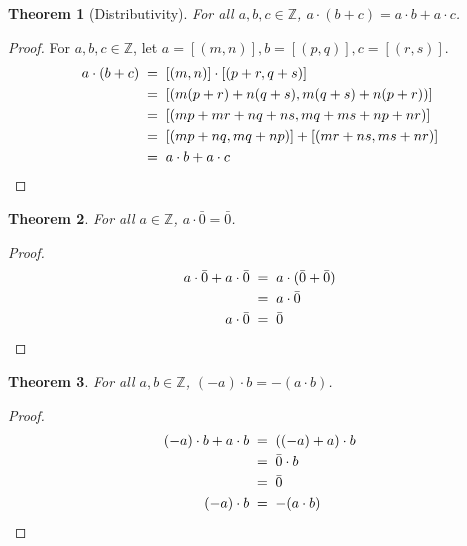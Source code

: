 \documentclass[10pt]{article}
\newtheorem{theorem}{Theorem}[section]
\theoremstyle{definition}
\theoremstyle{remark}
\begin{document}
        \begin{theorem}[Distributivity]
                For all $a,b,c \in \mathbb{Z}$, $a\cdot(b + c) = a\cdot b + a\cdot c$.
        \end{theorem}
        \begin{proof}
                For $a,b,c \in \mathbb{Z}$, let $a = [(m, n)], b = [(p, q)], c = [(r, s)]$.
                \begin{align*}
                        a\cdot (b + c) \;&=\; [(m, n)] \cdot [(p + r, q + s)] \\
                                \;&=\; [(m(p + r) + n(q + s), m(q + s) + n(p + r))] \\
                                \;&=\; [(mp + mr + nq + ns, mq + ms + np + nr)] \\
                                \;&=\; [(mp + nq, mq + np)] + [(mr + ns, ms + nr)] \\
                                \;&=\; a\cdot b + a\cdot c \qedhere
                \end{align*}
        \end{proof}
        \begin{theorem}
                For all $a \in \mathbb{Z}$, $a\cdot \bar{0} = \bar{0}$.
        \end{theorem}
        \begin{proof}
                \begin{align*}
                        a\cdot \bar{0} + a\cdot\bar{0} \;&=\; a\cdot (\bar{0} + \bar{0}) \\
                                \;&=\; a\cdot\bar{0} \\
                        a\cdot \bar{0} \;&=\; \bar{0} \qedhere
                \end{align*}
        \end{proof}
        \begin{theorem}
                For all $a, b \in \mathbb{Z}$, $(-a)\cdot b = -(a\cdot b)$.
        \end{theorem}
        \begin{proof}
                \begin{align*}
                        (-a)\cdot b + a\cdot b \;&=\; ((-a) + a)\cdot b \\
                                \;&=\; \bar{0} \cdot b \\
                                \;&=\; \bar{0}\\
                        (-a)\cdot b \;&=\; -(a\cdot b) \qedhere
                \end{align*}
        \end{proof}
\end{document}
